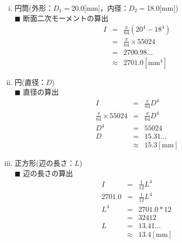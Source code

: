 \documentclass[twocolumn,a4j]{jsarticle}
\begin{document}
\begin{enumerate}[(i)]
    \item 円筒(外形：$D_1=$20.0[mm]，内径：$D_2=$18.0[mm])\\
          $\blacksquare$ 断面二次モーメントの算出
          \begin{eqnarray*}
              I &=& \frac{\pi}{64} \left(20^4 - 18^4\right)\\
              &=& \frac{\pi}{64} × 55024\\
              &=& 2700.98 \dots\\
              &\approx& 2701.0 \left[\mathrm{mm^4}\right]
          \end{eqnarray*}
    \item 円(直径：$D$)\\
          $\blacksquare$ 直径の算出
          \begin{eqnarray*}
              I &=& \frac{\pi}{64}D^4\\
              \frac{\pi}{64} × 55024 &=& \frac{\pi}{64}D^4\\
              D^4 &=& 55024\\
              D&=& 15.31\dots\\
              &\approx& 15.3 \left[\mathrm{mm}\right]
          \end{eqnarray*}
    \item 正方形(辺の長さ：$L$)\\
          $\blacksquare$ 辺の長さの算出
          \begin{eqnarray*}
              I &=& \frac{1}{12}L^4\\
              2701.0 &=& \frac{1}{12}L^4\\
              L^4 &=& 2701.0 * 12\\
              &=& 32412\\
              L&=& 13.41\dots\\
              &\approx& 13.4 \left[\mathrm{mm}\right]
          \end{eqnarray*}
\end{enumerate}

\end{document}
